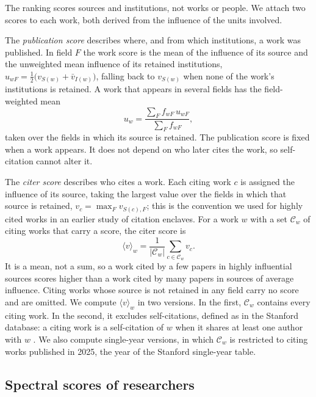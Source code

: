 The ranking scores sources and institutions, not works or people. We attach two scores to each work, both derived from the influence of the units involved.

The \emph{publication score} describes where, and from which institutions, a work was published. In field $F$ the work score is the mean of the influence of its source and the unweighted mean influence of its retained institutions, $u_{wF} = \frac{1}{2}\big(v_{S(w)} + \bar{v}_{I(w)}\big)$, falling back to $v_{S(w)}$ when none of the work's institutions is retained. A work that appears in several fields has the field-weighted mean
\begin{equation}
  u_w = \frac{\sum_F f_{wF}\, u_{wF}}{\sum_F f_{wF}} ,
  \label{eq:pubv}
\end{equation}
taken over the fields in which its source is retained. The publication score is fixed when a work appears. It does not depend on who later cites the work, so self-citation cannot alter it.

The \emph{citer score} describes who cites a work. Each citing work $c$ is assigned the influence of its source, taking the largest value over the fields in which that source is retained, $v_c = \max_F v_{S(c),F}$; this is the convention we used for highly cited works in an earlier study of citation enclaves. For a work $w$ with a set $\mathcal{C}_w$ of citing works that carry a score, the citer score is
\begin{equation}
  \langle v \rangle_w = \frac{1}{|\mathcal{C}_w|} \sum_{c \in \mathcal{C}_w} v_c .
  \label{eq:citerv}
\end{equation}
It is a mean, not a sum, so a work cited by a few papers in highly influential sources scores higher than a work cited by many papers in sources of average influence. Citing works whose source is not retained in any field carry no score and are omitted. We compute $\langle v \rangle_w$ in two versions. In the first, $\mathcal{C}_w$ contains every citing work. In the second, it excludes self-citations, defined as in the Stanford database: a citing work is a self-citation of $w$ when it shares at least one author with $w$ \citep{ioannidisStandardizedCitationMetrics2019a}. We also compute single-year versions, in which $\mathcal{C}_w$ is restricted to citing works published in 2025, the year of the Stanford single-year table.

\subsection{Spectral scores of researchers}

